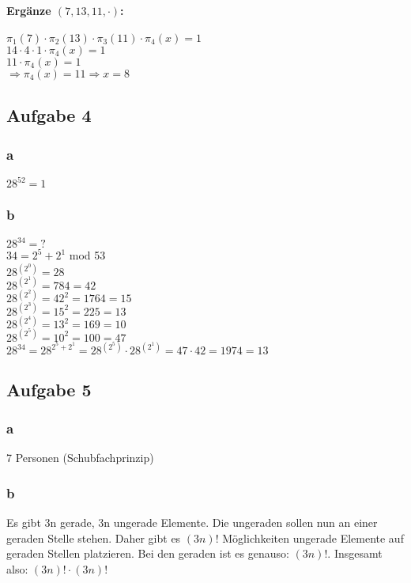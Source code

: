 \paragraph{Ergänze $(7,13,11,\cdot)$:}
$\pi_{1}(7) \cdot  \pi_{2}(13) \cdot  \pi_{3}(11) \cdot  \pi_{4}(x)=1$\\
$14 \cdot  4 \cdot  1 \cdot  \pi_{4}(x)=1$\\
$11 \cdot  \pi_{4}(x)=1$\\
$\Rightarrow \pi_{4}(x)=11 \Rightarrow x=8$

\subsection{Aufgabe 4}

\subsubsection{a}
$28^{52} = 1$ 

\subsubsection{b}
$28^{34}=?$\\
$34=2^5 + 2^1$ mod 53\\
$28^{(2^0)} = 28$\\
$28^{(2^1)} = 784 = 42$\\
$28^{(2^2)} = 42^2 = 1764 = 15$\\
$28^{(2^3)} = 15^2 = 225 = 13$\\
$28^{(2^4)} = 13^2 = 169 = 10$\\
$28^{(2^5)} = 10^2 = 100 = 47$\\
$28^{34} = 28^{2^5+2^1}= 28^{(2^5)} \cdot  28^{(2^1)} = 47 \cdot  42 = 1974 = 13$

\subsection{Aufgabe 5}

\subsubsection{a} 
7 Personen (Schubfachprinzip)

\subsubsection{b} 
Es gibt 3n gerade, 3n ungerade Elemente. Die ungeraden sollen nun an einer geraden Stelle stehen. Daher gibt es $(3n)!$ Möglichkeiten ungerade Elemente auf geraden Stellen platzieren. Bei den geraden ist es genauso: $(3n)!$. Insgesamt also: $(3n)! \cdot  (3n)!$

